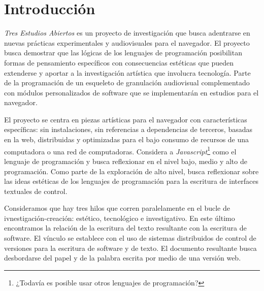 
\section*{Introducción}

\textit{Tres Estudios Abiertos} es un proyecto de investigación que busca adentrarse en nuevas prácticas experimentales y audiovisuales para el navegador. El proyecto busca demostrar que las lógicas de los lenguajes de programación posibilitan formas de pensamiento específicos con consecuencias estéticas que pueden extenderse y aportar a la investigación artística que involucra tecnología. Parte de la programación de un esqueleto de granulación audiovisual complementado con módulos personalizados de software que se implementarán en estudios para el navegador. 

El proyecto se centra en piezas artísticas para el navegador con características específicas: sin instalaciones, sin referencias a dependencias de terceros, basadas en la web, distribuidas y optimizadas para el bajo consumo de recursos de una computadora o una red de computadoras. Considera a \textit{Javascript}\footnote{¿Todavía es posible usar otros lenguajes de programación?} como el lenguaje de programación y busca reflexionar en el nivel bajo, medio y alto de programación. Como parte de la exploración de alto nivel, busca reflexionar sobre las ideas estéticas de los lenguajes de programación para la escritura de interfaces textuales de control. 

Consideramos que hay tres hilos que corren paralelamente en el bucle de ivnestigación-creación: estético, tecnológico e investigativo. En este último encontramos la relación de la escritura del texto resultante con la escritura de software. El vínculo se establece con el uso de sistemas distribuidos de control de versiones para la escritura de software y de texto. El documento resultante busca desbordarse del papel y de la palabra escrita por medio de una versión web. 
